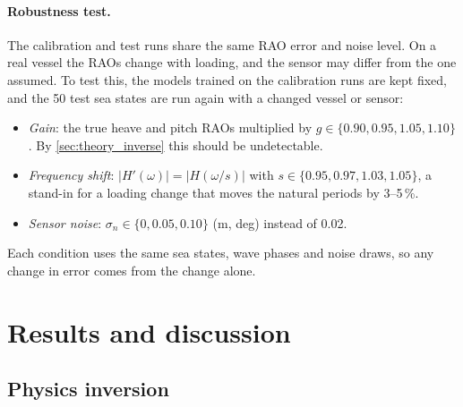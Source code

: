 \documentclass[10pt,a4paper,twocolumn,twoside]{article}
\begin{document}
\paragraph{Robustness test.}
The calibration and test runs share the same RAO error and noise level. On a real vessel the RAOs
change with loading, and the sensor may differ from the one assumed. To test this, the models
trained on the calibration runs are kept fixed, and the 50 test sea states are run again with a
changed vessel or sensor:
\begin{itemize}
\item \emph{Gain}: the true heave and pitch RAOs multiplied by $g \in \{0.90, 0.95, 1.05, 1.10\}$.
By \cref{sec:theory_inverse} this should be undetectable.
\item \emph{Frequency shift}: $|H'(\omega)| = |H(\omega/s)|$ with $s \in \{0.95, 0.97, 1.03, 1.05\}$,
a stand-in for a loading change that moves the natural periods by 3--5\,\%.
\item \emph{Sensor noise}: $\sigma_n \in \{0, 0.05, 0.10\}$ (m, deg) instead of 0.02.
\end{itemize}
Each condition uses the same sea states, wave phases and noise draws, so any change in error comes
from the change alone.

\section{Results and discussion}
\label{sec:results}

\subsection{Physics inversion}
\end{document}
